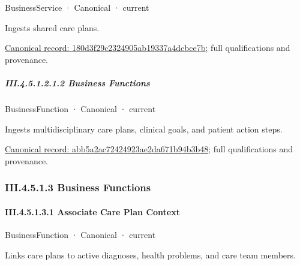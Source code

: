 \label{element:180d3f29c2324905ab19337a4dcbce7b}
{\small BusinessService · Canonical · current}\par

Ingests shared care plans.


{\footnotesize \href{../../../../../../../../continuum/business/business-service/180d3f29c2324905ab19337a4dcbce7b.md}{Canonical record: 180d3f29c2324905ab19337a4dcbce7b}; full qualifications and provenance.}\par
\subparagraph*{III.4.5.1.2.1.2 Business Functions}
\label{navigation:III.4.5.1.2.1.2}

\label{navigation:III.4.5.1.2.1.2.1}

\label{element:abb5a2ac72424923ae2da671b94b3b48}
{\small BusinessFunction · Canonical · current}\par

Ingests multidisciplinary care plans, clinical goals, and patient action steps.


{\footnotesize \href{../../../../../../../../continuum/business/business-function/abb5a2ac72424923ae2da671b94b3b48.md}{Canonical record: abb5a2ac72424923ae2da671b94b3b48}; full qualifications and provenance.}\par
\subsubsection*{III.4.5.1.3 Business Functions}
\label{navigation:III.4.5.1.3}

\paragraph*{III.4.5.1.3.1 Associate Care Plan Context}
\label{navigation:III.4.5.1.3.1}

\label{element:98cd313fdaa74634a8e1ae56a5bb06dc}
{\small BusinessFunction · Canonical · current}\par

Links care plans to active diagnoses, health problems, and care team members.


